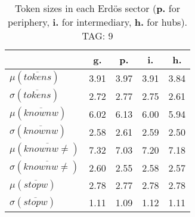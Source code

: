 \begin{table}[h!]
\begin{center}
\begin{tabular}{| l || c | c | c | c |}\hline
 & {\bf g.} & {\bf p.} & {\bf i.} & {\bf h.} \\\hline\hline
$\mu(\overline{tokens})$ & 3.91  & 3.97  & 3.91  & 3.84 \\
$\sigma(\overline{tokens})$ & 2.72  & 2.77  & 2.75  & 2.61 \\\hline
$\mu(\overline{knownw})$ & 6.02  & 6.13  & 6.00  & 5.94 \\
$\sigma(\overline{knownw})$ & 2.58  & 2.61  & 2.59  & 2.50 \\\hline
$\mu(\overline{knownw \neq})$ & 7.32  & 7.03  & 7.20  & 7.18 \\
$\sigma(\overline{knownw \neq})$ & 2.60  & 2.55  & 2.58  & 2.57 \\\hline
$\mu(\overline{stopw})$ & 2.78  & 2.77  & 2.78  & 2.78 \\
$\sigma(\overline{stopw})$ & 1.11  & 1.09  & 1.12  & 1.11 \\\hline
\end{tabular}
\caption{Token sizes in each Erd\"os sector ({{\bf p.}} for periphery, {{\bf i.}} for intermediary, {{\bf h.}} for hubs). TAG: 9}
\end{center}
\end{table}